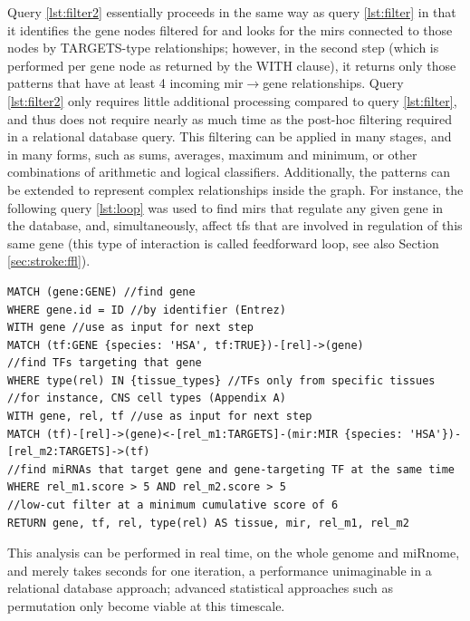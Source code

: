 Query \ref{lst:filter2} essentially proceeds in the same way as query \ref{lst:filter} in that it identifies the gene nodes filtered for and looks for the \acp{mir} connected to those nodes by TARGETS-type relationships; however, in the second step (which is performed per gene node as returned by the \textcolor{dkblue}{WITH} clause), it returns only those patterns that have at least 4 incoming \ac{mir}$\to$gene relationships. Query \ref{lst:filter2} only requires little additional processing compared to query \ref{lst:filter}, and thus does not require nearly as much time as the post-hoc filtering required in a relational database query. This filtering can be applied in many stages, and in many forms, such as sums, averages, maximum and minimum, or other combinations of arithmetic and logical classifiers. Additionally, the patterns can be extended to represent complex relationships inside the graph. For instance, the following query \ref{lst:loop} was used to find \acp{mir} that regulate any given gene in the database, and, simultaneously, affect \acp{tf} that are involved in regulation of this same gene (this type of interaction is called feedforward loop, see also Section \ref{sec:stroke:ffl}).

\begin{lstlisting}[label=lst:loop,
caption=Feedforward Loop Identification,
language=Cypher]
MATCH (gene:GENE) //find gene
WHERE gene.id = ID //by identifier (Entrez)
WITH gene //use as input for next step
MATCH (tf:GENE {species: 'HSA', tf:TRUE})-[rel]->(gene) 
//find TFs targeting that gene
WHERE type(rel) IN {tissue_types} //TFs only from specific tissues
//for instance, CNS cell types (Appendix A)
WITH gene, rel, tf //use as input for next step
MATCH (tf)-[rel]->(gene)<-[rel_m1:TARGETS]-(mir:MIR {species: 'HSA'})-[rel_m2:TARGETS]->(tf) 
//find miRNAs that target gene and gene-targeting TF at the same time
WHERE rel_m1.score > 5 AND rel_m2.score > 5 
//low-cut filter at a minimum cumulative score of 6
RETURN gene, tf, rel, type(rel) AS tissue, mir, rel_m1, rel_m2
\end{lstlisting}

This analysis can be performed in real time, on the whole genome and miRnome, and merely takes seconds for one iteration, a performance unimaginable in a relational database approach; advanced statistical approaches such as permutation only become viable at this timescale.


